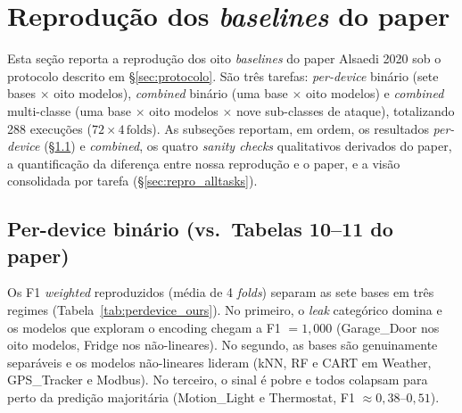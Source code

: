 \section{Reprodução dos \emph{baselines} do paper}
\label{sec:reproducao}

Esta seção reporta a reprodução dos oito \emph{baselines} do paper
Alsaedi 2020 sob o protocolo descrito em \S{}\ref{sec:protocolo}.
São três tarefas: \emph{per-device} binário (sete bases $\times$ oito
modelos), \emph{combined} binário (uma base $\times$ oito modelos) e
\emph{combined} multi-classe (uma base $\times$ oito modelos $\times$ nove
sub-classes de ataque), totalizando 288 execuções
($72 \times 4\,\text{folds}$). As subseções reportam, em ordem, os
resultados \emph{per-device} (\S{}\ref{sec:reproducao_perdevice}) e
\emph{combined}, os quatro \emph{sanity checks} qualitativos derivados do
paper, a quantificação da diferença entre nossa reprodução e o paper, e
a visão consolidada por tarefa (\S{}\ref{sec:repro_alltasks}).

\subsection{Per-device binário (vs.\ Tabelas 10--11 do paper)}
\label{sec:reproducao_perdevice}

Os F1 \emph{weighted} reproduzidos (média de 4 \emph{folds}) separam as
sete bases em três regimes (Tabela~\ref{tab:perdevice_ours}). No primeiro,
o \emph{leak} categórico domina e os modelos que exploram o encoding
chegam a F1 $=1{,}000$ (Garage\_Door nos oito modelos, Fridge nos
não-lineares). No segundo, as bases são genuinamente separáveis e os
modelos não-lineares lideram (kNN, RF e CART em Weather, GPS\_Tracker e
Modbus). No terceiro, o sinal é pobre e todos colapsam para perto da
predição majoritária (Motion\_Light e Thermostat, F1 $\approx 0{,}38$--$0{,}51$).

